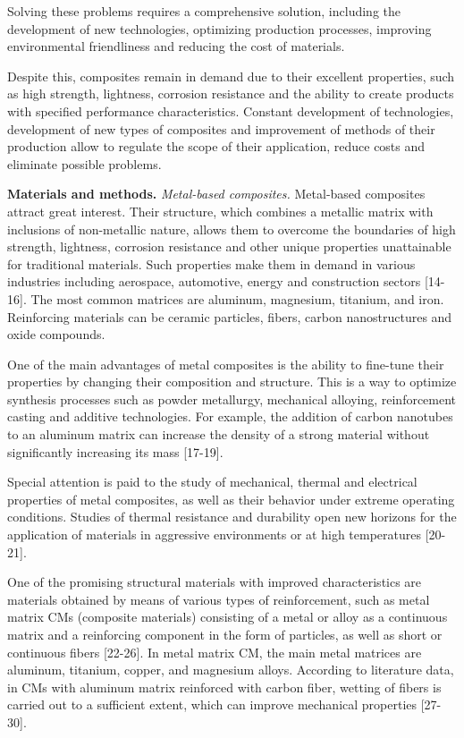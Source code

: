\begin{multicols}{2}
Solving these problems requires a comprehensive solution, including the
development of new technologies, optimizing production processes,
improving environmental friendliness and reducing the cost of materials.

Despite this, composites remain in demand due to their excellent
properties, such as high strength, lightness, corrosion resistance and
the ability to create products with specified performance
characteristics. Constant development of technologies, development of
new types of composites and improvement of methods of their production
allow to regulate the scope of their application, reduce costs and
eliminate possible problems.

{\bfseries Materials and methods.} \emph{Metal-based composites.}
Metal-based composites attract great interest. Their structure, which
combines a metallic matrix with inclusions of non-metallic nature,
allows them to overcome the boundaries of high strength, lightness,
corrosion resistance and other unique properties unattainable for
traditional materials. Such properties make them in demand in various
industries including aerospace, automotive, energy and construction
sectors {[}14-16{]}. The most common matrices are aluminum, magnesium,
titanium, and iron. Reinforcing materials can be ceramic particles,
fibers, carbon nanostructures and oxide compounds.

One of the main advantages of metal composites is the ability to
fine-tune their properties by changing their composition and structure.
This is a way to optimize synthesis processes such as powder metallurgy,
mechanical alloying, reinforcement casting and additive technologies.
For example, the addition of carbon nanotubes to an aluminum matrix can
increase the density of a strong material without significantly
increasing its mass {[}17-19{]}.

Special attention is paid to the study of mechanical, thermal and
electrical properties of metal composites, as well as their behavior
under extreme operating conditions. Studies of thermal resistance and
durability open new horizons for the application of materials in
aggressive environments or at high temperatures {[}20-21{]}.

One of the promising structural materials with improved characteristics
are materials obtained by means of various types of reinforcement, such
as metal matrix CMs (composite materials) consisting of a metal or alloy
as a continuous matrix and a reinforcing component in the form of
particles, as well as short or continuous fibers {[}22-26{]}. In metal
matrix CM, the main metal matrices are aluminum, titanium, copper, and
magnesium alloys. According to literature data, in CMs with aluminum
matrix reinforced with carbon fiber, wetting of fibers is carried out to
a sufficient extent, which can improve mechanical properties
{[}27-30{]}.


\end{multicols}
